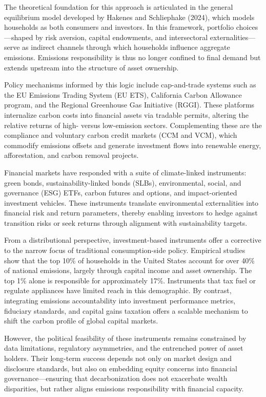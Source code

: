 \documentclass[12pt,a4paper]{article}%
\begin{document}
The theoretical foundation for this approach is articulated in the general equilibrium model developed by Hakenes and Schliephake (2024), which models households as both consumers and investors. In this framework, portfolio choices---shaped by risk aversion, capital endowments, and intersectoral externalities---serve as indirect channels through which households influence aggregate emissions. Emissions responsibility is thus no longer confined to final demand but extends upstream into the structure of asset ownership.

Policy mechanisms informed by this logic include cap-and-trade systems such as the EU Emissions Trading System (EU ETS), California Carbon Allowance program, and the Regional Greenhouse Gas Initiative (RGGI). These platforms internalize carbon costs into financial assets via tradable permits, altering the relative returns of high- versus low-emission sectors. Complementing these are the compliance and voluntary carbon credit markets (CCM and VCM), which commodify emissions offsets and generate investment flows into renewable energy, afforestation, and carbon removal projects.

Financial markets have responded with a suite of climate-linked instruments: green bonds, sustainability-linked bonds (SLBs), environmental, social, and governance (ESG) ETFs, carbon futures and options, and impact-oriented investment vehicles. These instruments translate environmental externalities into financial risk and return parameters, thereby enabling investors to hedge against transition risks or seek returns through alignment with sustainability targets.

From a distributional perspective, investment-based instruments offer a corrective to the narrow focus of traditional consumption-side policy. Empirical studies show that the top 10\% of households in the United States account for over 40\% of national emissions, largely through capital income and asset ownership. The top 1\% alone is responsible for approximately 17\%. Instruments that tax fuel or regulate appliances have limited reach in this demographic. By contrast, integrating emissions accountability into investment performance metrics, fiduciary standards, and capital gains taxation offers a scalable mechanism to shift the carbon profile of global capital markets.

However, the political feasibility of these instruments remains constrained by data limitations, regulatory asymmetries, and the entrenched power of asset holders. Their long-term success depends not only on market design and disclosure standards, but also on embedding equity concerns into financial governance---ensuring that decarbonization does not exacerbate wealth disparities, but rather aligns emissions responsibility with financial capacity.
\end{document}
